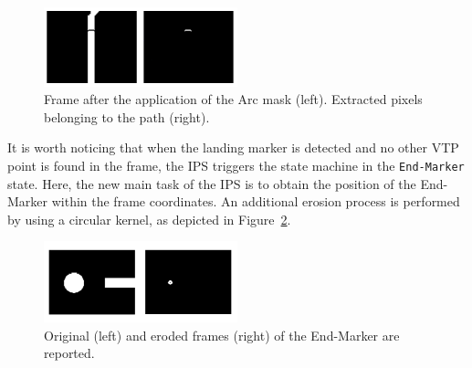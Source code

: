 \documentclass[a4paper,twocolumn,10pt]{article}
\begin{document}
    \begin{figure}
        \centering
        \includegraphics[width=0.5\textwidth]{pics/fig8_frame.png}
        \caption{Frame after the application of the Arc mask (left). Extracted pixels belonging to the 
        path (right).}
        \label{fig:track}
    \end{figure}
    
    It is worth noticing that when the landing marker is detected and no other VTP point is found 
    in the frame, the IPS triggers the state machine in the \texttt{End-Marker} state. Here, the 
    new main task of the IPS is to obtain the position of the End-Marker within the frame 
    coordinates. An additional erosion process is performed by using a circular kernel, as depicted in 
    Figure~\ref{fig:End_marker}. 
    
    \begin{figure}
        \centering
        \includegraphics[width=0.5\textwidth]{pics/fig9_frame.png}
        \caption{Original (left) and eroded frames (right) of the End-Marker are reported.}
        \label{fig:End_marker}
    \end{figure}
\end{document}
